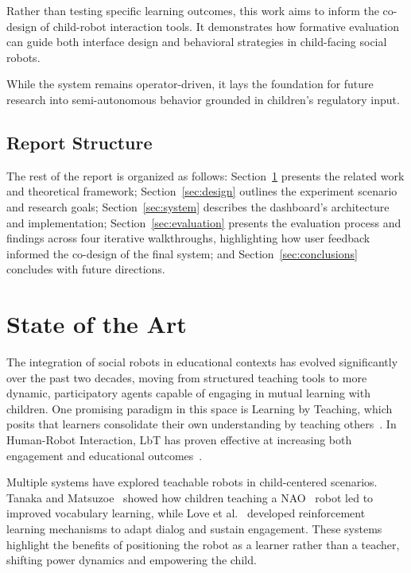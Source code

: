 \documentclass[a4paper]{usiinfbachelorproject}
\begin{document}
Rather than testing specific learning outcomes, this work aims to inform the co-design of child-robot interaction tools.
It demonstrates how formative evaluation can guide both interface design and behavioral strategies in child-facing social robots.

While the system remains operator-driven, it lays the foundation for future research into semi-autonomous behavior grounded in children's regulatory input.

\subsection{\textbf{Report Structure}}
The rest of the report is organized as follows:
Section~\ref{sec:background} presents the related work and theoretical framework;
Section~\ref{sec:design} outlines the experiment scenario and research goals;
Section~\ref{sec:system} describes the dashboard's architecture and implementation;
Section~\ref{sec:evaluation} presents the evaluation process and findings across four iterative walkthroughs, highlighting how user feedback informed the co-design of the final system;
and Section~\ref{sec:conclusions} concludes with future directions.

\section{\textbf{State of the Art}}\label{sec:background}
The integration of social robots in educational contexts has evolved significantly over the past two decades, moving from structured teaching tools to more dynamic, participatory agents capable of engaging in mutual learning with children.
One promising paradigm in this space is Learning by Teaching, which posits that learners consolidate their own understanding by teaching others~\cite{biswas2005learning}.
In Human-Robot Interaction, LbT has proven effective at increasing both engagement and educational outcomes~\cite{10.5898/JHRI.1.1.Tanaka, love2024teachable}.

Multiple systems have explored teachable robots in child-centered scenarios.
Tanaka and Matsuzoe~\cite{10.5898/JHRI.1.1.Tanaka} showed how children teaching a NAO~\cite{nao_robot} robot led to improved vocabulary learning, while Love et al.~\cite{love2023adapting, love2024teachable} developed reinforcement learning mechanisms to adapt dialog and sustain engagement.
These systems highlight the benefits of positioning the robot as a learner rather than a teacher, shifting power dynamics and empowering the child.
\end{document}
